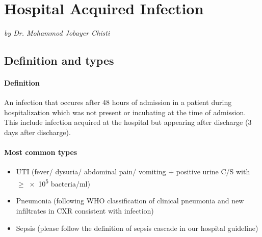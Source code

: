 \documentclass[11pt,a4paper]{report}
\begin{document}
\newpage
\section{Hospital Acquired Infection}
\textit{by Dr. Mohammod Jobayer Chisti}

\subsection{Definition and types}
\paragraph{Definition} 
An infection that occures after 48 hours of admission in a patient during hospitalization which was not present or incubating at the time of admission. This include infection acquired at the hospital but appearing after discharge (3 days after discharge). 

\paragraph{Most common types}
\begin{itemize}
	\item UTI (fever/ dysuria/ abdominal pain/ vomiting + positive urine C/S with $\geq$\num{e5} bacteria/ml)
	\item Pneumonia (following WHO classification of clinical pneumonia and new infiltrates in CXR consistent with infection)
	\item Sepsis (please follow the definition of sepsis cascade in our hospital guideline)
\end{itemize}
\end{document}
